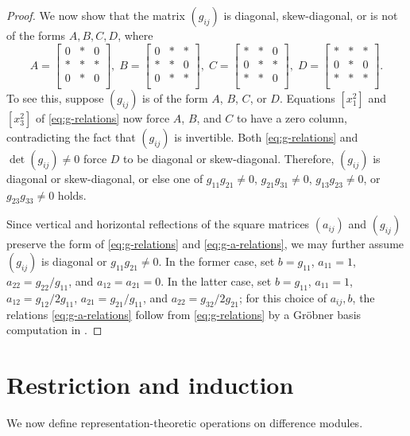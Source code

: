 \documentclass[11pt,reqno]{amsart}
\theoremstyle{definition}
\begin{document}
\begin{proof}
We now show that the matrix $(g_{ij})$ is diagonal, skew-diagonal, or is not of the forms $A,B,C,D$, where
\[
    A=\begin{bmatrix}
    0 & * & 0\\
    * & * & *\\
    0 & * & 0\\
    \end{bmatrix},\;
    B=\begin{bmatrix}
    0 & * & *\\
    * & * & 0\\
    0 & * & *\\
    \end{bmatrix},\;
    C=\begin{bmatrix}
    * & * & 0\\
    0 & * & *\\
    * & * & 0\\
    \end{bmatrix},\;
    D=\begin{bmatrix}
    * & * & *\\
    0 & * & 0\\
    * & * & *\\
    \end{bmatrix}.
\]
To see this, suppose $(g_{ij})$ is of the form $A$, $B$, $C$, or $D$. Equations $[x_1^2]$ and $[x_3^2]$ of \eqref{eq:g-relations} now force $A$, $B$, and $C$ to have a zero column, contradicting the fact that $(g_{ij})$ is invertible. Both \eqref{eq:g-relations} and $\det(g_{ij})\neq 0$ force $D$ to be diagonal or skew-diagonal. Therefore, $(g_{ij})$ is diagonal or skew-diagonal, or else one of $g_{11}g_{21}\neq 0$, $g_{21}g_{31}\neq 0$, $g_{13}g_{23}\neq 0$, or $g_{23}g_{33}\neq 0$ holds.

Since vertical and horizontal reflections of the square matrices $(a_{ij})$ and $(g_{ij})$ preserve the form of \eqref{eq:g-relations} and \eqref{eq:g-a-relations}, 
we may further assume $(g_{ij})$ is diagonal or $g_{11}g_{21}\neq 0$. In the former case, 
set $b=g_{11}$, $a_{11}=1$, $a_{22}=g_{22}/g_{11}$, and $a_{12}=a_{21}=0$. In the latter case, set
$b= g_{11}$, 
$a_{11}= 1$, $a_{12}= g_{12}/2g_{11}$, 
$a_{21}= g_{21}/g_{11}$, and
$a_{22}= g_{32}/2g_{21}$; for this choice of $a_{ij}, b$,
the relations \eqref{eq:g-a-relations} follow from \eqref{eq:g-relations} by a Gröbner basis computation in .
\end{proof}

\section{Restriction and induction}
\label{section:restriction-induction}
We now define representation-theoretic operations on difference modules.
\end{document}

